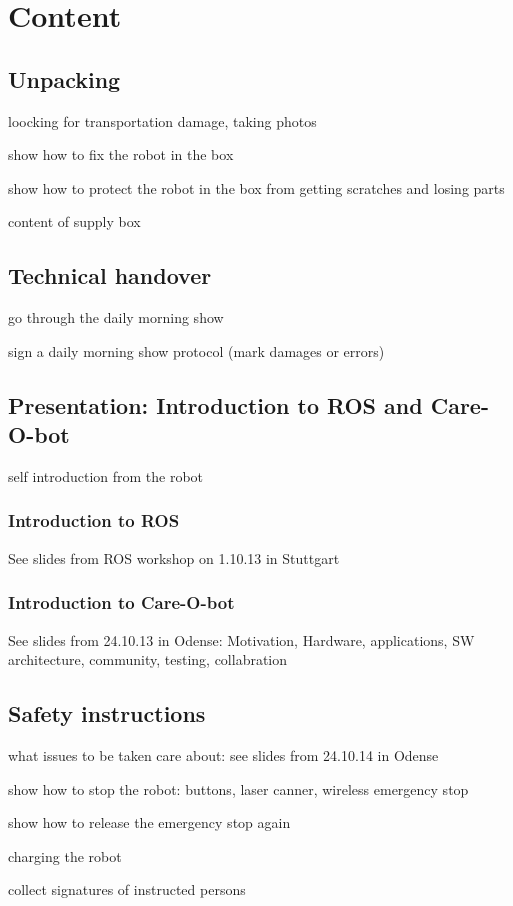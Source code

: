 \documentclass[12pt,twoside]{report}
\begin{document}
\chapter{Content}

\section{Unpacking}
loocking for transportation damage, taking photos

show how to fix the robot in the box

show how to protect the robot in the box from getting scratches and losing parts

content of supply box

\section{Technical handover}
go through the daily morning show

sign a daily morning show protocol (mark damages or errors)

\section{Presentation: Introduction to ROS and Care-O-bot}
self introduction from the robot

\subsection{Introduction to ROS}
See slides from ROS workshop on 1.10.13 in Stuttgart
\subsection{Introduction to Care-O-bot}
See slides from 24.10.13 in Odense: Motivation, Hardware, applications, SW architecture, community, testing, collabration

\section{Safety instructions}
what issues to be taken care about: see slides from 24.10.14 in Odense

show how to stop the robot: buttons, laser canner, wireless emergency stop

show how to release the emergency stop again

charging the robot

collect signatures of instructed persons
\end{document}
